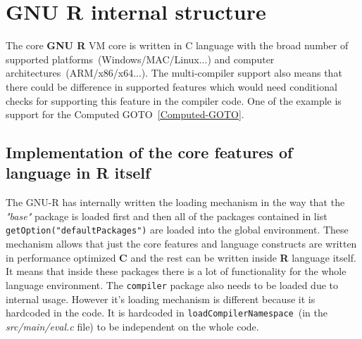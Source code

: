 \documentclass[thesis=M,english]{FITthesis}[2018/10/20]
\newcommand{\code}[1]{\texttt{#1}}
\begin{document}






\section{GNU R internal structure}\label{R-internal-structure}

The core \textbf{GNU R} VM core is written in C language with the broad number of supported platforms~(Windows/MAC/Linux...) and computer architectures~(ARM/x86/x64...). The multi-compiler support also means that there could be difference in supported features which would need conditional checks for supporting this feature in the compiler code. One of the example is support for the Computed GOTO~\ref{Computed-GOTO}.

\subsection{Implementation of the core features of language in R itself}

The GNU-R has internally written the loading mechanism in the way that the \textit{"base"} package is loaded first and then all of the packages contained in list \code{getOption("defaultPackages")} are loaded into the global environment. These mechanism allows that just the core features and language constructs are written in performance optimized \textbf{C} and the rest can be written inside \textbf{R} language itself. It means that inside these packages there is a lot of functionality for the whole language environment. The \code{compiler} package also needs to be loaded due to internal usage. However it's loading mechanism is different because it is hardcoded in the code. It is hardcoded in \code{loadCompilerNamespace}~(in the \textit{src/main/eval.c} file) to be independent on the whole code.
\end{document}
